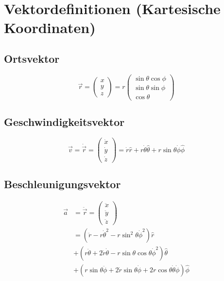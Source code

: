\section{Vektordefinitionen (Kartesische Koordinaten)}

\subsection*{Ortsvektor}
\begin{equation}
\vec{r} = \begin{pmatrix} x \\ y \\ z \end{pmatrix} = r \begin{pmatrix} \sin\theta\cos\phi \\ \sin\theta\sin\phi \\ \cos\theta \end{pmatrix}
\end{equation}

\subsection*{Geschwindigkeitsvektor}
\begin{equation}
\vec{v} = \dot{\vec{r}} = \begin{pmatrix} \dot{x} \\ \dot{y} \\ \dot{z} \end{pmatrix} = \dot{r}\hat{r} + r\dot{\theta}\hat{\theta} + r\sin\theta\dot{\phi}\hat{\phi}
\end{equation}

\subsection*{Beschleunigungsvektor}
\begin{align}
\vec{a} &= \ddot{\vec{r}} = \begin{pmatrix} \ddot{x} \\ \ddot{y} \\ \ddot{z} \end{pmatrix} \nonumber \\
&= \left(\ddot{r} - r\dot{\theta}^2 - r\sin^2\theta\dot{\phi}^2\right)\hat{r} \nonumber \\
&+ \left(r\ddot{\theta} + 2\dot{r}\dot{\theta} - r\sin\theta\cos\theta\dot{\phi}^2\right)\hat{\theta} \nonumber \\
&+ \left(r\sin\theta\ddot{\phi} + 2\dot{r}\sin\theta\dot{\phi} + 2r\cos\theta\dot{\theta}\dot{\phi}\right)\hat{\phi}
\end{align}